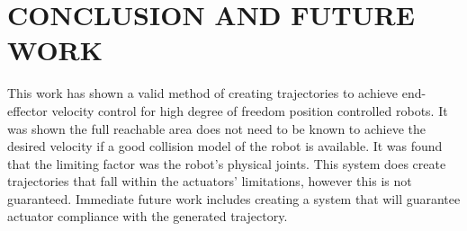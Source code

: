\section{CONCLUSION AND FUTURE WORK}
This work has shown a valid method of creating trajectories to achieve end-effector velocity control for high degree of freedom position controlled robots.  It was shown the full reachable area does not need to be known to achieve the desired velocity if a good collision model of the robot is available.  It was found that the limiting factor was the robot's physical joints.  This system does create trajectories that fall within the actuators' limitations, however this is not guaranteed.  Immediate future work includes creating a system that will guarantee actuator compliance with the generated trajectory.